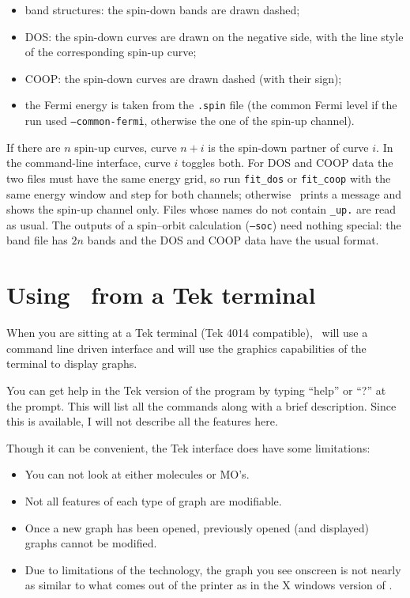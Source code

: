 \begin{itemize}
\item band structures: the spin-down bands are drawn dashed;
\item DOS: the spin-down curves are drawn on the negative side, with
the line style of the corresponding spin-up curve;
\item COOP: the spin-down curves are drawn dashed (with their sign);
\item the Fermi energy is taken from the {\tt .spin} file (the common
Fermi level if the run used {\tt --common-fermi}, otherwise the one of
the spin-up channel).
\end{itemize}

If there are $n$ spin-up curves, curve $n+i$ is the spin-down partner of
curve $i$. In the command-line interface, {\sf curve} $i$ toggles both.
For DOS and COOP data the two files must have the same energy grid, so
run {\tt fit\_dos} or {\tt fit\_coop} with the same energy window and
step for both channels; otherwise \viewprog\ prints a message and shows
the spin-up channel only. Files whose names do not contain {\tt \_up.}
are read as usual. The outputs of a spin--orbit calculation ({\tt --soc})
need nothing special: the band file has $2n$ bands and the DOS and COOP
data have the usual format.

\section{Using \viewprog\ from a Tek terminal}

When you are sitting at a Tek terminal (Tek 4014 compatible),
\viewprog\ will use a command line driven interface and will use the
graphics capabilities of the terminal to display graphs. 

You can get help in the Tek version of the program by typing ``help''
or ``?'' at the prompt.  This will list all the commands along with a
brief description.  Since this is available, I will not describe all
the features here.

Though it can be convenient, the Tek interface does have some
limitations: 

\begin{itemize}
\item You can not look at either molecules or MO's.

\item Not all features of each type of graph are modifiable.

\item Once a new graph has been opened, previously opened (and
displayed) graphs cannot be modified.

\item Due to limitations of the technology, the graph you see onscreen
is not nearly as similar to what comes out of the printer as in
the X windows version of \viewprog.

\end{itemize}

